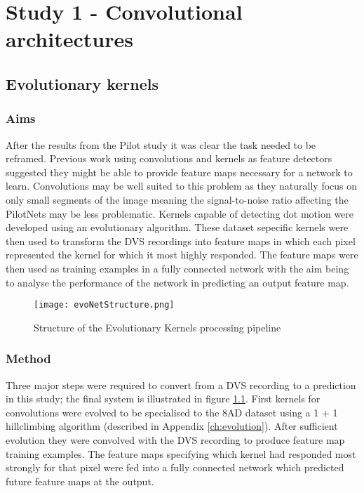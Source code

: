 \chapter{Study 1 - Convolutional architectures}
\label{ch:convolutions}

\section{Evolutionary kernels}

\subsection{Aims}
After the results from the Pilot study it was clear the task needed to be reframed.
Previous work using convolutions and kernels as feature detectors suggested they might be able to provide feature maps necessary for a network to learn.
Convolutions may be well suited to this problem as they naturally focus on only small segments of the image meaning the signal-to-noise ratio affecting the PilotNets may be less problematic. 
Kernels capable of detecting dot motion were developed using an evolutionary algorithm. 
These dataset sepecific kernels were then used to transform the DVS recordings into feature maps in which each pixel represented the kernel for which it most highly responded. 
The feature maps were then used as training examples in a fully connected network with the aim being to analyse the performance of the network in predicting an output feature map. 

\begin{figure}[h]
    \centering
    \texttt{[image: evoNetStructure.png]}
    \caption{Structure of the Evolutionary Kernels processing pipeline}
    \label{fig:evoNetStructure}
\end{figure}

\subsection{Method}
Three major steps were required to convert from a DVS recording to a prediction in this study; the final system is illustrated in figure \ref{fig:evoNetStructure}.
First kernels for convolutions were evolved to be specialised to the 8AD dataset using a 1 + 1 hillclimbing algorithm (described in Appendix \ref{ch:evolution}). 
After sufficient evolution they were convolved with the DVS recording to produce feature map training examples.
The feature maps specifying which kernel had responded most strongly for that pixel were fed into a fully connected network which predicted future feature maps at the output.  

